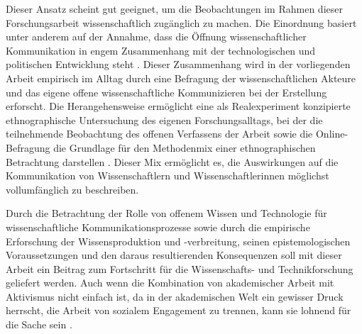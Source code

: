 Dieser Ansatz scheint gut geeignet, um die Beobachtungen im Rahmen dieser Forschungsarbeit wissenschaftlich zugänglich zu machen. Die Einordnung basiert unter anderem auf der Annahme, dass die Öffnung wissenschaftlicher Kommunikation in engem Zusammenhang mit der technologischen und politischen Entwicklung steht \cite{Weingart_2005}. Dieser Zusammenhang wird in der vorliegenden Arbeit empirisch im Alltag durch eine Befragung der wissenschaftlichen Akteure und das eigene offene wissenschaftliche Kommunizieren bei der Erstellung erforscht. Die Herangehensweise ermöglicht eine als Realexperiment konzipierte ethnographische Untersuchung des eigenen Forschungsalltags, bei der die teilnehmende Beobachtung des offenen Verfassens der Arbeit sowie die Online-Befragung die Grundlage für den Methodenmix einer ethnographischen Betrachtung darstellen \cite{Bachmann_2011}. Dieser Mix ermöglicht es, die Auswirkungen auf die Kommunikation von Wissenschaftlern und Wissenschaftlerinnen möglichst vollumfänglich zu beschreiben.

Durch die Betrachtung der Rolle von offenem Wissen und Technologie für wissenschaftliche Kommunikationsprozesse sowie durch die empirische Erforschung der Wissensproduktion und -verbreitung, seinen epistemologischen Voraussetzungen und den daraus resultierenden Konsequenzen \cite[:12]{Beck_2014} soll mit dieser Arbeit ein Beitrag zum Fortschritt für die Wissenschafts- und Technikforschung geliefert werden. Auch wenn die Kombination von akademischer Arbeit mit Aktivismus nicht einfach ist, da in der akademischen Welt ein gewisser Druck herrscht, die Arbeit von sozialem Engagement zu trennen, kann sie lohnend für die Sache sein \cite[:25]{Flood_2013}.
